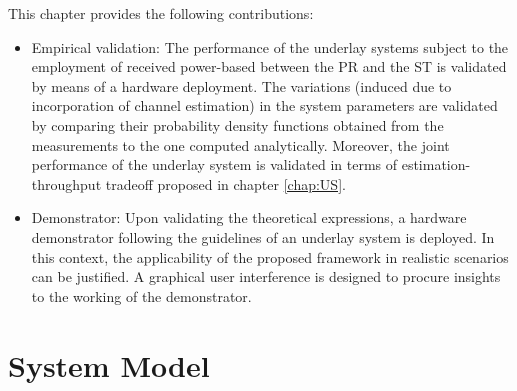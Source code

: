 This chapter provides the following contributions:
\begin{itemize}
	\item Empirical validation: The performance of the underlay systems subject to the employment of received power-based between the PR and the ST is validated by means of a hardware deployment. The variations (induced due to incorporation of channel estimation) in the system parameters are validated by comparing their probability density functions obtained from the measurements to the one computed analytically. Moreover, the joint performance of the underlay system is validated in terms of estimation-throughput tradeoff proposed in chapter \ref{chap:US}. %
	\item Demonstrator: Upon validating the theoretical expressions, a hardware demonstrator following the guidelines of an underlay system is deployed. In this context, the applicability of the proposed framework in realistic scenarios can be justified. A graphical user interference is designed to procure insights to the working of the demonstrator.	
\end{itemize}



\section{System Model}
\label{sysmod}

